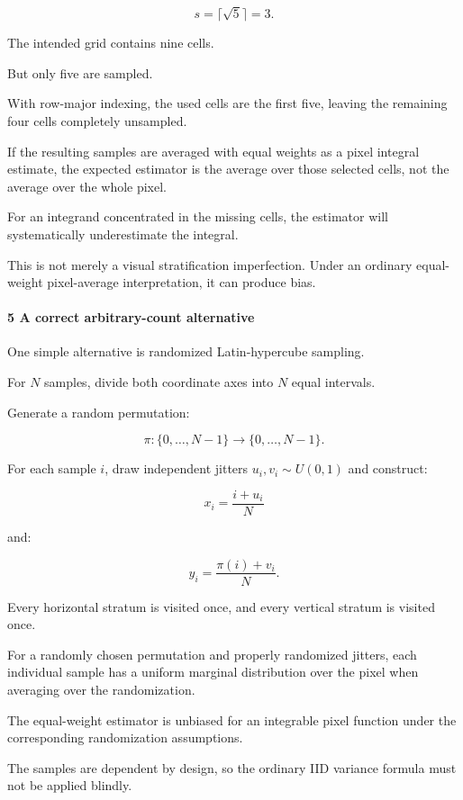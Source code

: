 \[
 s=\lceil\sqrt5\rceil=3.
\]

The intended grid contains nine cells.

But only five are sampled.

With row-major indexing, the used cells are the first five, leaving the remaining four cells completely unsampled.

If the resulting samples are averaged with equal weights as a pixel integral estimate, the expected estimator is the average over those selected cells, not the average over the whole pixel.

For an integrand concentrated in the missing cells, the estimator will systematically underestimate the integral.

This is not merely a visual stratification imperfection. Under an ordinary equal-weight pixel-average interpretation, it can produce bias.

\paragraph{5 A correct arbitrary-count alternative}\label{02-foundations-ii-ch039-a-correct-arbitrary-count-alternative}

One simple alternative is randomized Latin-hypercube sampling.

For \(N\) samples, divide both coordinate axes into \(N\) equal intervals.

Generate a random permutation:

\[
 \pi:\{0,\ldots,N-1\}\rightarrow\{0,\ldots,N-1\}.
\]

For each sample \(i\), draw independent jitters \(u_i,v_i\sim U(0,1)\) and construct:

\[
 \boxed{ x_i=\frac{i+u_i}{N} }
\]

and:

\[
 \boxed{ y_i=\frac{\pi(i)+v_i}{N} }.
\]

Every horizontal stratum is visited once, and every vertical stratum is visited once.

For a randomly chosen permutation and properly randomized jitters, each individual sample has a uniform marginal distribution over the pixel when averaging over the randomization.

The equal-weight estimator is unbiased for an integrable pixel function under the corresponding randomization assumptions.

The samples are dependent by design, so the ordinary IID variance formula must not be applied blindly.

